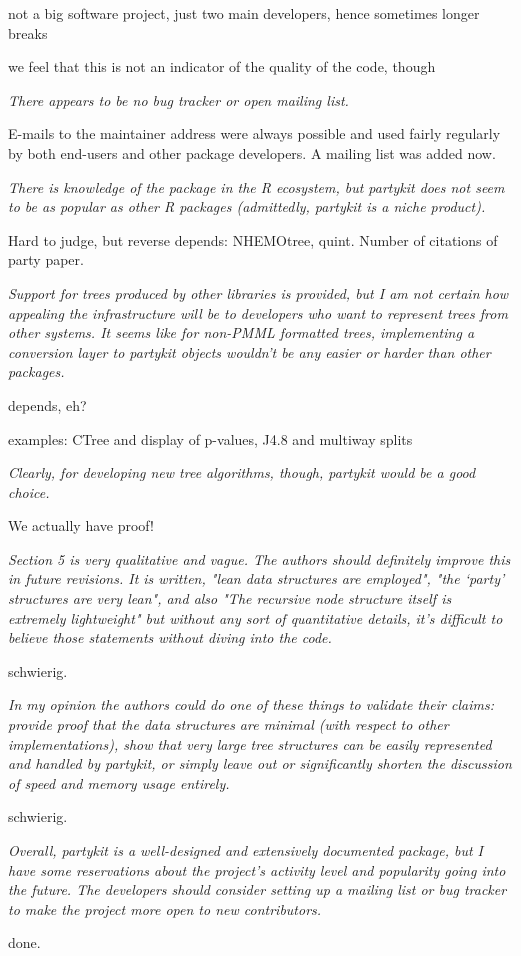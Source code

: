 \documentclass{article}
\begin{document}
not a big software project, just two main developers, hence sometimes longer breaks

we feel that this is not an indicator of the quality of the code, though

\textit{There appears to
be no bug tracker or open mailing list.}

E-mails to the maintainer address were always possible and used fairly regularly
by both end-users and other package developers. A mailing list was added now.

\textit{There is knowledge of the package
in the R ecosystem, but partykit does not seem to be as popular as other R
packages (admittedly, partykit is a niche product).}

Hard to judge, but reverse depends: NHEMOtree, quint. Number of citations of party paper.

\textit{
Support for trees produced by other libraries is provided, but I am not
certain how appealing the infrastructure will be to developers who want to
represent trees from other systems.  It seems like for non-PMML formatted
trees, implementing a conversion layer to partykit objects wouldn't be any
easier or harder than other packages.}

depends, eh?

examples: CTree and display of p-values, J4.8 and multiway splits

\textit{
Clearly, for developing new tree algorithms, though, partykit would be a good choice.}

We actually have proof!

\textit{
Section 5 is very qualitative and vague.  The authors should definitely
improve this in future revisions.  It is written, "lean data structures are
employed", "the `party' structures are very lean", and also "The recursive
node structure itself is extremely lightweight" but without any sort of
quantitative details, it's difficult to believe those statements without
diving into the code.}

schwierig.

\textit{
In my opinion the authors could do one of these things to validate their
claims: provide proof that the data structures are minimal (with respect to
other implementations), show that very large tree structures can be easily
represented and handled by partykit, or simply leave out or significantly
shorten the discussion of speed and memory usage entirely.}

schwierig.

\textit{
Overall, partykit is a well-designed and extensively documented package, but
I have some reservations about the project's activity level and popularity
going into the future.  The developers should consider setting up a mailing
list or bug tracker to make the project more open to new contributors.}

done.



\end{document}
